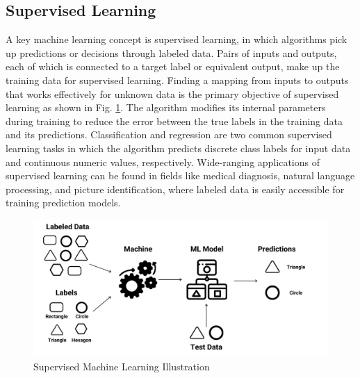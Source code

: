     \subsection{Supervised Learning}
    A key machine learning concept is supervised learning, in which algorithms pick up predictions or decisions through labeled data. Pairs of inputs and outputs, each of which is connected to a target label or equivalent output, make up the training data for supervised learning. Finding a mapping from inputs to outputs that works effectively for unknown data is the primary objective of supervised learning as shown in Fig. \ref{fig:SL}. The algorithm modifies its internal parameters during training to reduce the error between the true labels in the training data and its predictions. Classification and regression are two common supervised learning tasks in which the algorithm predicts discrete class labels for input data and continuous numeric values, respectively. Wide-ranging applications of supervised learning can be found in fields like medical diagnosis, natural language processing, and picture identification, where labeled data is easily accessible for training prediction models.
        \begin{figure}[H]
            \centering
            \includegraphics[width=0.9\linewidth]{Images/supervised.png}
            \caption{Supervised Machine Learning Illustration \cite{Raj_2022}}
            \label{fig:SL}
        \end{figure}\clearpage
